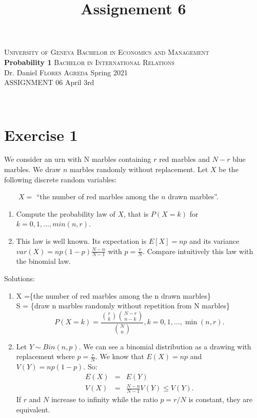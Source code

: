 \documentclass[12pt,thmsa]{article}\usepackage[]{graphicx}\usepackage[]{color}
\title{Assignement 6}
\begin{document}
\noindent \textsc{University of Geneva}     \hfill \textsc{Bachelor in Economics and Management} \\
\textbf{Probability 1}                      \hfill \textsc{Bachelor in International Relations} \\
Dr. Daniel \textsc{Flores Agreda}                 \hfill Spring 2021  \\
ASSIGNMENT 06                               \hfill   April 3rd



\noindent
\makebox[\linewidth]{\rule{\textwidth}{0.4pt}}\\[1.5ex]


\section*{Exercise 1}

We consider an urn with N marbles containing $r$ red marbles and $N-r$ blue marbles. We draw $n$ marbles randomly without replacement.
Let $X$ be the following discrete random variables:

$ \qquad X=$ ``the number of red marbles among the $n$ drawn marbles''.

\begin{enumerate}
  \item Compute the probability law of $X$, that is $P(X=k)$ for $k=0,1,...,min(n,r)$.
  \item This law is well known. Its expectation is $E[X]=np$ and its variance $var(X)=np(1-p)\frac{N-n}{N-1}$ with $p=\frac{r}{N}$.
  Compare intuitively this law with the binomial law.
\end{enumerate}
\noindent Solutions:

\begin{enumerate}
  \item X =\{the number of red marbles among the n drawn marbles\}\\
          S = \{draw n marbles randomly without repetition from N marbles\}\\
  \begin{equation*}
  P(X=k) = \frac{\binom{r}{k} \binom{N-r}{n-k}}{\binom{N}{n}} , k=0,1,...,\min(n,r).
  \end{equation*}

  \item Let $Y \sim Bin(n,p)$. We can see a binomial distribution as a drawing with replacement where $p=\frac{r}{N}$.
  We know that $E(X)=np$ and $V(Y)=np(1-p)$. So:\begin{eqnarray*}
                                                  E(X) &=& E(Y) \\
                                                  V(X) &=& \frac{N-n}{N-1}V(Y) \leq V(Y).
                                                \end{eqnarray*}
  If $r$ and $N$ increase to infinity while the ratio $p=r/N$ is constant, they are equivalent.
\end{enumerate}
\end{document}
